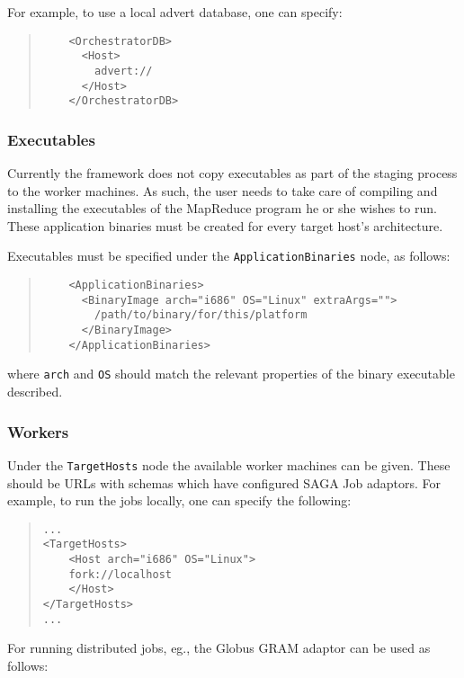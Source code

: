 \documentclass{article}
\begin{document}
For example, to use a local advert database, one can specify:

\begin{quote}
\begin{verbatim}
    <OrchestratorDB>
      <Host>
        advert://
      </Host>
    </OrchestratorDB>
\end{verbatim}
\end{quote}

\subsubsection{Executables}

Currently the framework does not copy executables as part of the staging process to the worker machines. As such, the user needs to take care of compiling and installing the executables of the MapReduce program he or she wishes to run. These application binaries must be created for every target host's architecture.

Executables must be specified under the \texttt{ApplicationBinaries} node, as follows:
\begin{quote}
\begin{verbatim}
    <ApplicationBinaries>
      <BinaryImage arch="i686" OS="Linux" extraArgs="">
        /path/to/binary/for/this/platform
      </BinaryImage>
    </ApplicationBinaries>
\end{verbatim}
\end{quote}
where \texttt{arch} and \texttt{OS} should match the relevant properties of the binary executable described.

\subsubsection{Workers}

Under the \texttt{TargetHosts} node the available worker machines can be given. These should be URLs with schemas which have configured SAGA Job adaptors. For example, to run the jobs locally, one can specify the following:

\begin{quote}
\begin{verbatim}
...
<TargetHosts>
    <Host arch="i686" OS="Linux">
    fork://localhost
    </Host>
</TargetHosts>
...
\end{verbatim}
\end{quote}

For running distributed jobs, eg., the Globus GRAM adaptor can be used as follows:
\end{document}
